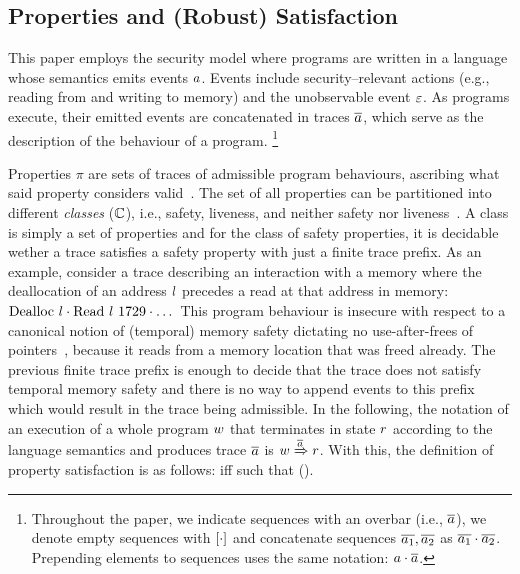 \documentclass[utf8,acmsmall,review,screen,dvipsnames]{acmart}
\begin{document}
\subsection{Properties and (Robust) Satisfaction}\label{subsec:bg:tprop}

This paper employs the security model where programs are written in a language whose semantics emits events $\event$.
Events include security--relevant actions (e.g., reading from and writing to memory) and the unobservable event $\emptyevent$.
As programs execute, their emitted events are concatenated in traces $\trace$, which serve as the description of the behaviour of a program.%
\footnote{
Throughout the paper, we indicate sequences with an overbar (i.e., $\trace$), we denote empty sequences with $\hole{\cdot}$ and concatenate sequences $\trace[_{1}],\trace[_{2}]$ as $\trace[_{1}]\cdot\trace[_{2}]$.
Prepending elements to sequences uses the same notation: $\event\cdot\trace$.
}

Properties $\pi$ are sets of traces of admissible program behaviours, ascribing what said property considers valid~\cite{clarkson2008hyper}.
The set of all properties can be partitioned into different {\em classes} ($\class$), i.e., safety, liveness, and neither safety nor liveness~\cite{clarkson2008hyper}.
A class is simply a set of properties and for the class of safety properties, it is decidable wether a trace satisfies a safety property with just a finite trace prefix.
As an example, consider a trace describing an interaction with a memory where the deallocation of an address $\loc$ precedes a read at that address in memory: $\ev{Dealloc\ \loc}\cdot\ev{Read\ \loc\ 1729}\cdot\dots$
This program behaviour is insecure with respect to a canonical notion of (temporal) memory safety dictating no use-after-frees of pointers~\cite{nagarakatte2010cets}, because it reads from a memory location that was freed already.
The previous finite trace prefix is enough to decide that the trace does not satisfy temporal memory safety and there is no way to append events to this prefix which would result in the trace being admissible.
In the following, the notation of an execution of a whole program $\wholeprogvar$ that terminates in state $\runtimetermvar$ according to the language semantics and produces trace $\trace$ is $\progstepto{\wholeprogvar}{\runtimetermvar}{\trace}$.
With this, the definition of property satisfaction is as follows:
 iff  such that  ().
\end{document}
